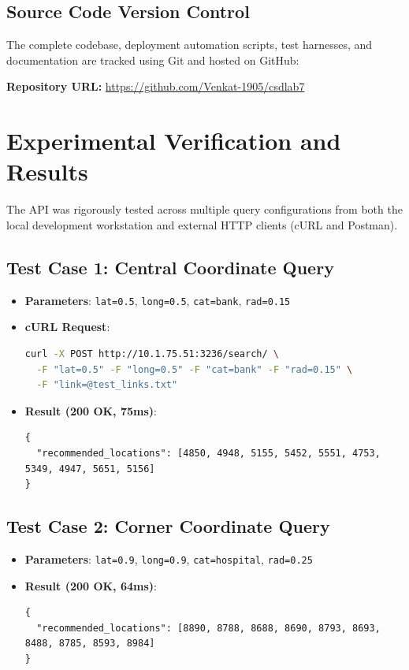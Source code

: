 \documentclass[11pt,a4paper]{article}
\begin{document}
\subsection{Source Code Version Control}
The complete codebase, deployment automation scripts, test harnesses, and documentation are tracked using Git and hosted on GitHub:
\begin{center}
    \textbf{Repository URL:} \url{https://github.com/Venkat-1905/csdlab7}
\end{center}

\section{Experimental Verification and Results}

The API was rigorously tested across multiple query configurations from both the local development workstation and external HTTP clients (cURL and Postman).

\subsection{Test Case 1: Central Coordinate Query}
\begin{itemize}
    \item \textbf{Parameters}: \texttt{lat=0.5}, \texttt{long=0.5}, \texttt{cat=bank}, \texttt{rad=0.15}
    \item \textbf{cURL Request}:
\begin{lstlisting}[language=bash]
curl -X POST http://10.1.75.51:3236/search/ \
  -F "lat=0.5" -F "long=0.5" -F "cat=bank" -F "rad=0.15" \
  -F "link=@test_links.txt"
\end{lstlisting}
    \item \textbf{Result (200 OK, 75ms)}:
\begin{lstlisting}[basicstyle=\ttfamily\footnotesize]
{
  "recommended_locations": [4850, 4948, 5155, 5452, 5551, 4753, 5349, 4947, 5651, 5156]
}
\end{lstlisting}
\end{itemize}

\subsection{Test Case 2: Corner Coordinate Query}
\begin{itemize}
    \item \textbf{Parameters}: \texttt{lat=0.9}, \texttt{long=0.9}, \texttt{cat=hospital}, \texttt{rad=0.25}
    \item \textbf{Result (200 OK, 64ms)}:
\begin{lstlisting}[basicstyle=\ttfamily\footnotesize]
{
  "recommended_locations": [8890, 8788, 8688, 8690, 8793, 8693, 8488, 8785, 8593, 8984]
}
\end{lstlisting}
\end{itemize}
\end{document}
